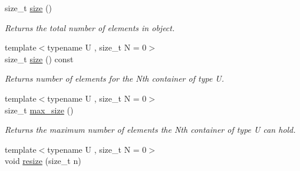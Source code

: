 \begin{DoxyCompactItemize}
\item 
\hypertarget{classheterogeneous_1_1heterovector_3_01_t_00_01_types_8_8_8_4_a5a5c77fa457498417231e43eee4057bc}{}size\+\_\+t \hyperlink{classheterogeneous_1_1heterovector_3_01_t_00_01_types_8_8_8_4_a5a5c77fa457498417231e43eee4057bc}{size} ()\label{classheterogeneous_1_1heterovector_3_01_t_00_01_types_8_8_8_4_a5a5c77fa457498417231e43eee4057bc}

\begin{DoxyCompactList}\small\item\em Returns the total number of elements in object. \end{DoxyCompactList}\item 
\hypertarget{classheterogeneous_1_1heterovector_3_01_t_00_01_types_8_8_8_4_adb46283e309899af9b9c0a4991821ca8}{}{\footnotesize template$<$typename U , size\+\_\+t N = 0$>$ }\\size\+\_\+t \hyperlink{classheterogeneous_1_1heterovector_3_01_t_00_01_types_8_8_8_4_adb46283e309899af9b9c0a4991821ca8}{size} () const \label{classheterogeneous_1_1heterovector_3_01_t_00_01_types_8_8_8_4_adb46283e309899af9b9c0a4991821ca8}

\begin{DoxyCompactList}\small\item\em Returns number of elements for the Nth container of type U. \end{DoxyCompactList}\item 
\hypertarget{classheterogeneous_1_1heterovector_3_01_t_00_01_types_8_8_8_4_aaf0cab2093bf2f8abd6d2b834763ec02}{}{\footnotesize template$<$typename U , size\+\_\+t N = 0$>$ }\\size\+\_\+t \hyperlink{classheterogeneous_1_1heterovector_3_01_t_00_01_types_8_8_8_4_aaf0cab2093bf2f8abd6d2b834763ec02}{max\+\_\+size} ()\label{classheterogeneous_1_1heterovector_3_01_t_00_01_types_8_8_8_4_aaf0cab2093bf2f8abd6d2b834763ec02}

\begin{DoxyCompactList}\small\item\em Returns the maximum number of elements the Nth container of type U can hold. \end{DoxyCompactList}\item 
\hypertarget{classheterogeneous_1_1heterovector_3_01_t_00_01_types_8_8_8_4_a13cd1f80cfb6cc2dea5d77cc4dc23bdf}{}{\footnotesize template$<$typename U , size\+\_\+t N = 0$>$ }\\void \hyperlink{classheterogeneous_1_1heterovector_3_01_t_00_01_types_8_8_8_4_a13cd1f80cfb6cc2dea5d77cc4dc23bdf}{resize} (size\+\_\+t n)\label{classheterogeneous_1_1heterovector_3_01_t_00_01_types_8_8_8_4_a13cd1f80cfb6cc2dea5d77cc4dc23bdf}


\end{DoxyCompactItemize}
